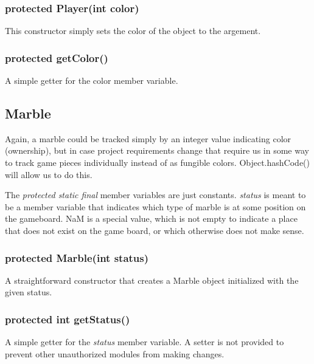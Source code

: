 \documentclass{article}
\begin{document}
\subsubsection*{protected Player(int color)}
This constructor simply sets the color of the object to the argement.

\subsubsection*{protected getColor()}
A simple getter for the color member variable.

\subsection{Marble}
Again, a marble could be tracked simply by an integer value indicating color (ownership), but in case project requirements change that require us in some way to track game pieces individually instead of as fungible colors. Object.hashCode() will allow us to do this.


The \textit{protected static final} member variables are just constants. \textit{status} is meant to be a member variable that indicates which type of marble is at some position on the gameboard. NaM is a special value, which is not empty to indicate a place that does not exist on the game board, or which otherwise does not make sense.

\subsubsection*{protected Marble(int status)}
A straightforward constructor that creates a Marble object initialized with the given status.

\subsubsection*{protected int getStatus()}
A simple getter for the \textit{status} member variable. A setter is not provided to prevent other unauthorized modules from making changes.
\end{document}
